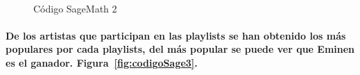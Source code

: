 \documentclass[11pt,spanish]{article}
\begin{document}
\begin{figure}[H]
	\begin{center}
%
	   
	   \\ %
	  
%
	\end{center}
	\caption{%
	Código SageMath 2
 	}%
	\label{fig:codigoSage2}
\end{figure}


\paragraph*{De los artistas que participan en las playlists se han obtenido 
los más populares por cada playlists, del más popular se puede ver que Eminen es el ganador. Figura~\ref{fig:codigoSage3}.}
\end{document}

